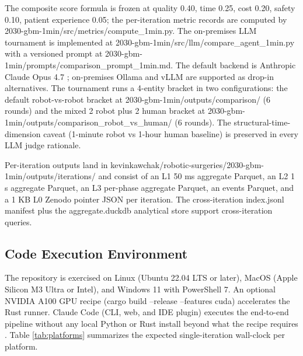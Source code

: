 The composite score formula is frozen at quality 0.40, time 0.25,
cost 0.20, safety 0.10, patient experience 0.05; the per-iteration
metric records are computed by
2030-gbm-1min/src/metrics/compute_1min.py. The on-premises LLM
tournament is implemented at 2030-gbm-1min/src/llm/compare_agent_1min.py
with a versioned prompt at 2030-gbm-1min/prompts/comparison_prompt_1min.md.
The default backend is Anthropic Claude Opus 4.7
\cite{claude-opus-47, claude-code}; on-premises Ollama \cite{ollama}
and vLLM \cite{vllm} are supported as drop-in alternatives. The
tournament runs a 4-entity bracket in two configurations: the default
robot-vs-robot bracket at 2030-gbm-1min/outputs/comparison/ (6
rounds) and the mixed 2 robot plus 2 human bracket at
2030-gbm-1min/outputs/comparison_robot_vs_human/ (6 rounds). The
structural-time-dimension caveat (1-minute robot vs 1-hour human
baseline) is preserved in every LLM judge rationale.

Per-iteration outputs land in
kevinkawchak/robotic-surgeries/2030-gbm-1min/outputs/iterations/ and
consist of an L1 50 ms aggregate Parquet, an L2 1 s aggregate
Parquet, an L3 per-phase aggregate Parquet, an events Parquet, and
a 1 KB L0 Zenodo pointer JSON per iteration. The cross-iteration
index.jsonl manifest plus the aggregate.duckdb analytical store
\cite{duckdb} support cross-iteration queries.

\subsection{Code Execution Environment}
\label{sec:methods-execution}

The repository is exercised on Linux (Ubuntu 22.04 LTS or later),
MacOS (Apple Silicon M3 Ultra or Intel), and Windows 11 with
PowerShell 7. An optional NVIDIA A100 GPU recipe (cargo build
--release --features cuda) accelerates the Rust runner. Claude
Code (CLI, web, and IDE plugin) executes the end-to-end pipeline
without any local Python or Rust install beyond what the recipe
requires \cite{claude-code, claude-opus-47}. Table \ref{tab:platforms}
summarizes the expected single-iteration wall-clock per platform.

